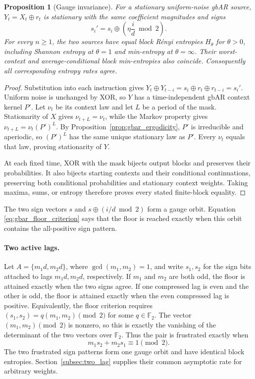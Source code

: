 \documentclass[11pt,a4paper]{article}
\newtheorem{proposition}[theorem]{Proposition}
\begin{document}
\begin{proposition}[Gauge invariance]
\label{prop:gauge_invariance}
For a stationary uniform-noise gbAR source, $Y_t=X_t\oplus r_t$
is stationary with the same coefficient magnitudes and signs
\begin{equation}
\label{eq:gauge_action}
    s_i'=s_i\oplus\left(\eta\frac{i}{d}\bmod2\right).
\end{equation}
For every $n\ge1$, the two sources have equal block R\'enyi
entropies $H_\theta$ for $\theta>0$, including Shannon entropy at
$\theta=1$ and min-entropy at $\theta=\infty$.  Their worst-context
and average-conditional block min-entropies also coincide.
Consequently all corresponding entropy rates agree.
\end{proposition}

\begin{proof}
Substitution into each instruction gives
$Y_t\oplus Y_{t-i}=s_i\oplus r_t\oplus r_{t-i}=s_i'$.
Uniform noise is unchanged by XOR, so $Y$ has a time-independent
gbAR context kernel $P'$.  Let $\nu_t$ be its context law and let
$L$ be a period of the mask.  Stationarity of $X$ gives
$\nu_{t+L}=\nu_t$, while the Markov property gives
$\nu_{t+L}=\nu_t(P')^L$.  By
Proposition~\ref{prop:gbar_ergodicity}, $P'$ is irreducible and
aperiodic, so $(P')^L$ has the same unique stationary law as $P'$.
Every $\nu_t$ equals that law, proving stationarity of $Y$.

At each fixed time, XOR with the mask bijects output blocks and
preserves their probabilities.  It also bijects starting contexts
and their conditional continuations, preserving both conditional
probabilities and stationary context weights.  Taking maxima, sums,
or entropy therefore proves every stated finite-block equality.
\end{proof}

The two sign vectors $s$ and
$s\oplus(i/d\bmod2)$ form a gauge orbit.  Equation
\eqref{eq:gbar_floor_criterion} says that the floor is reached exactly
when this orbit contains the all-positive sign pattern.

\paragraph{Two active lags.}
Let $A=\{m_1d,m_2d\}$, where $\gcd(m_1,m_2)=1$, and write
$s_1,s_2$ for the sign bits attached to lags $m_1d,m_2d$, respectively.
If $m_1$ and $m_2$ are both odd, the
floor is attained exactly when the two signs agree.  If one compressed
lag is even and the other is odd, the floor is attained exactly when
the even compressed lag is positive.  Equivalently, the floor criterion requires
$(s_1,s_2)=q(m_1,m_2)\pmod2$ for some $q\in\mathbb F_2$.
The vector $(m_1,m_2)\pmod2$ is nonzero, so this is exactly the
vanishing of the determinant of the two vectors over $\mathbb F_2$.
Thus the pair is frustrated exactly when
\begin{equation}
\label{eq:two_lag_parity}
    m_1s_2+m_2s_1\equiv1\pmod2.
\end{equation}
The two frustrated sign patterns form one gauge orbit and have
identical block entropies.  Section~\ref{subsec:two_lag} supplies
their common asymptotic rate for arbitrary weights.
\end{document}
